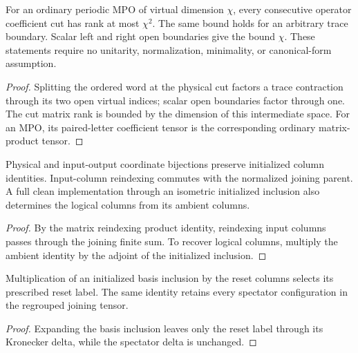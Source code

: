 \begin{lemma}
    \label{thm:mpu_periodic_operator_cut_rank}
    \leanok
    For an ordinary periodic MPO of virtual dimension $\chi$, every consecutive
    operator coefficient cut has rank at most $\chi^2$. The same bound holds for an
    arbitrary trace boundary. Scalar left and right open boundaries give the bound
    $\chi$. These statements require no unitarity, normalization, minimality, or
    canonical-form assumption.
\end{lemma}
\begin{proof}\leanok
    Splitting the ordered word at the physical cut factors a trace contraction
    through its two open virtual indices; scalar open boundaries factor through
    one. The cut matrix rank is bounded by the dimension of this intermediate
    space. For an MPO, its paired-letter coefficient tensor is the
    corresponding ordinary matrix-product tensor.
\end{proof}

\begin{lemma}
    \label{thm:mpu_column_coordinate_transport}
    \leanok
    Physical and input-output coordinate bijections preserve initialized
    column identities. Input-column reindexing commutes with the normalized joining
    parent. A full clean implementation through an isometric initialized inclusion
    also determines the logical columns from its ambient columns.
\end{lemma}
\begin{proof}\leanok
    By the matrix reindexing product identity, reindexing input columns passes
    through the joining finite sum. To recover logical columns, multiply the
    ambient identity by the adjoint of the initialized inclusion.
\end{proof}

\begin{lemma}
    \label{thm:mpu_joining_reset_columns}
    \leanok
    Multiplication of an initialized basis inclusion by the reset columns selects
    its prescribed reset label. The same identity retains every spectator
    configuration in the regrouped joining tensor.
\end{lemma}
\begin{proof}\leanok
    Expanding the basis inclusion leaves only the reset label through its Kronecker delta, while
    the spectator delta is unchanged.
\end{proof}


